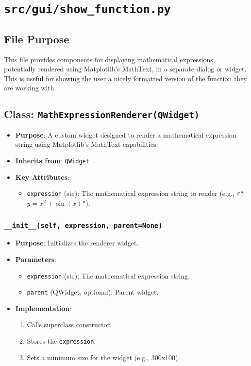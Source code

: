 \documentclass[12pt,a4paper]{report}
\begin{document}
\section{\texttt{src/gui/show\_function.py}}
\subsection{File Purpose}
This file provides components for displaying mathematical expressions, potentially rendered using Matplotlib's MathText, in a separate dialog or widget. This is useful for showing the user a nicely formatted version of the function they are working with.

\subsection{Class: \texttt{MathExpressionRenderer(QWidget)}}
\begin{itemize}
    \item \textbf{Purpose}: A custom widget designed to render a mathematical expression string using Matplotlib's MathText capabilities.
    \item \textbf{Inherits from}: \texttt{QWidget}
    \item \textbf{Key Attributes}:
        \begin{itemize}
            \item \texttt{expression} (str): The mathematical expression string to render (e.g., \texttt{r"$y = x^2 + \sin(x)$"}).
        \end{itemize}
\end{itemize}
\subsubsection{\texttt{\_\_init\_\_(self, expression, parent=None)}}
\begin{itemize}
    \item \textbf{Purpose}: Initializes the renderer widget.
    \item \textbf{Parameters}:
        \begin{itemize}
            \item \texttt{expression} (str): The mathematical expression string.
            \item \texttt{parent} (QWidget, optional): Parent widget.
        \end{itemize}
    \item \textbf{Implementation}:
        \begin{enumerate}
            \item Calls superclass constructor.
            \item Stores the \texttt{expression}.
            \item Sets a minimum size for the widget (e.g., 300x100).
        \end{enumerate}
\end{itemize}
\end{document}
